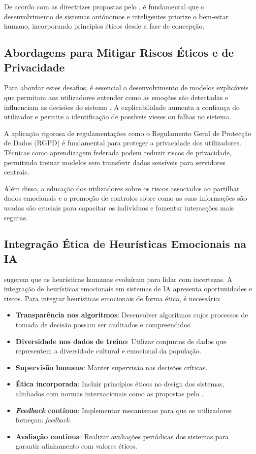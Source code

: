 \documentclass[a4paper,12pt]{report}
\begin{document}
	De acordo com as directrizes propostas pelo \textcite{ieee2019}, é fundamental que o desenvolvimento de sistemas autónomos e inteligentes priorize o bem-estar humano, incorporando princípios éticos desde a fase de concepção.
	
	\subsection{Abordagens para Mitigar Riscos Éticos e de Privacidade}
	
	Para abordar estes desafios, é essencial o desenvolvimento de modelos explicáveis que permitam aos utilizadores entender como as emoções são detectadas e influenciam as decisões do sistema \parencite{russell2020}. A explicabilidade aumenta a confiança do utilizador e permite a identificação de possíveis vieses ou falhas no sistema.
	
	A aplicação rigorosa de regulamentações como o Regulamento Geral de Protecção de Dados (RGPD) é fundamental para proteger a privacidade dos utilizadores. Técnicas como aprendizagem federada podem reduzir riscos de privacidade, permitindo treinar modelos sem transferir dados sensíveis para servidores centrais.
	
	Além disso, a educação dos utilizadores sobre os riscos associados ao partilhar dados emocionais e a promoção de controlos sobre como as suas informações são usadas são cruciais para capacitar os indivíduos e fomentar interacções mais seguras.
	
	\subsection{Integração Ética de Heurísticas Emocionais na IA}
	
	\textcite{gigerenzer2009} sugerem que as heurísticas humanas evoluíram para lidar com incertezas. A integração de heurísticas emocionais em sistemas de IA apresenta oportunidades e riscos. Para integrar heurísticas emocionais de forma ética, é necessário:
	
	\begin{itemize}
		\item \textbf{Transparência nos algoritmos}: Desenvolver algoritmos cujos processos de tomada de decisão possam ser auditados e compreendidos.
		\item \textbf{Diversidade nos dados de treino}: Utilizar conjuntos de dados que representem a diversidade cultural e emocional da população.
		\item \textbf{Supervisão humana}: Manter supervisão nas decisões críticas.
		\item \textbf{Ética incorporada}: Incluir princípios éticos no design dos sistemas, alinhados com normas internacionais como as propostas pelo \textcite{ieee2019}.
		\item \textbf{\textit{Feedback} contínuo}: Implementar mecanismos para que os utilizadores forneçam \textit{feedback}.
		\item \textbf{Avaliação contínua}: Realizar avaliações periódicas dos sistemas para garantir alinhamento com valores éticos.
	\end{itemize}
	
\end{document}

